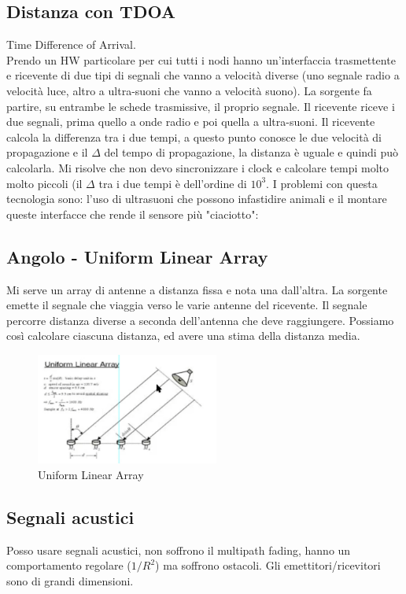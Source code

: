 \documentclass[12pt,italian]{report}
\begin{document}
\subsection{Distanza con TDOA}
Time Difference of Arrival. \\ Prendo un HW particolare per cui tutti i nodi hanno un'interfaccia trasmettente e ricevente di due tipi di segnali che vanno a velocità diverse (uno segnale radio a velocità luce, altro a ultra-suoni che vanno a velocità suono). 
\bigbreak
La sorgente fa partire, su entrambe le schede trasmissive, il proprio segnale. Il ricevente riceve i due segnali, prima quello a onde radio e poi quella a ultra-suoni. Il ricevente calcola la differenza tra i due tempi, a questo punto conosce le due velocità di propagazione e il $\Delta$ del tempo di propagazione, la distanza è uguale e quindi può calcolarla. 
\bigbreak
Mi risolve che non devo sincronizzare i clock e calcolare tempi molto molto piccoli (il $\Delta$ tra i due tempi è dell'ordine di $10^3$. I problemi con questa tecnologia sono: l'uso di ultrasuoni che possono infastidire animali e il montare queste interfacce che rende il sensore più "ciaciotto":

\subsection{Angolo - Uniform Linear Array}
Mi serve un array di antenne a distanza fissa e nota una dall'altra. La sorgente emette il segnale che viaggia verso le varie antenne del ricevente. Il segnale percorre distanza diverse a seconda dell'antenna che deve raggiungere. Possiamo così calcolare ciascuna distanza, ed avere una stima della distanza media. 
\begin{figure}[h]
\centering
\includegraphics[width=60mm]{img/angolo.PNG}
\caption{Uniform Linear Array}
\label{fig:ula}
\end{figure}

\subsection{Segnali acustici}
Posso usare segnali acustici, non soffrono il multipath fading, hanno un comportamento regolare ($1/R^2$) ma soffrono ostacoli. Gli emettitori/ricevitori sono di grandi dimensioni.
\end{document}
